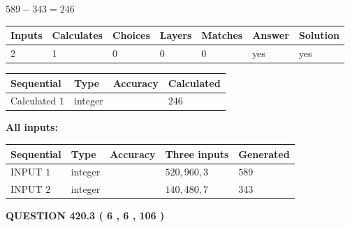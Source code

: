 \documentclass{ctexart}
\begin{document}
 

$ %
589 -  %
343=   %
246$
 
 
\noindent{}
 
 

 
   
   
   
   
\noindent\begin{tabular}{|l|l|l|l|l|l|l|}
 \hline
Inputs & Calculates & Choices & Layers & Matches & Answer & Solution \\ \hline
 2  & 
 1  & 
 0
  & 
 0  & 
 0  & 
  yes & 
  yes 
  \\ \hline
 \end{tabular}
   
   
   
   
\noindent{}
   
   
  
  
\noindent\begin{tabular}{|l|l|l|l|}
\hline
 Sequential & Type & Accuracy & Calculated \\ 
\hline
 
 
  Calculated $  1 $ & integer &  & 
  $ 246 $ 
 \\  \hline  
 \end{tabular}
   
   
   
   
\noindent\vspace{0.1in}\hspace{-0.08in} {\textbf{\Large{All inputs: }}}
   
   
  
  
\noindent\begin{tabular}{|l|l|l|l|l|}
\hline
 Sequential & Type & Accuracy & Three inputs & Generated \\ 
\hline
 
 
  INPUT $  1 $ & integer &  & $
 520
 , 
 960
 , 
 3
 $ & $ 589 $ 
 \\  \hline  
 
 
  INPUT $  2 $ & integer &  & $
 140
 , 
 480
 , 
 7
 $ & $ 343 $ 
 \\  \hline  
 \end{tabular}
   
   
  
\vspace{0.2in}
  
{\textbf{\Large{QUESTION
420.3 
 ( 6 , 6 , 106 )
}}}
  
\end{document}
